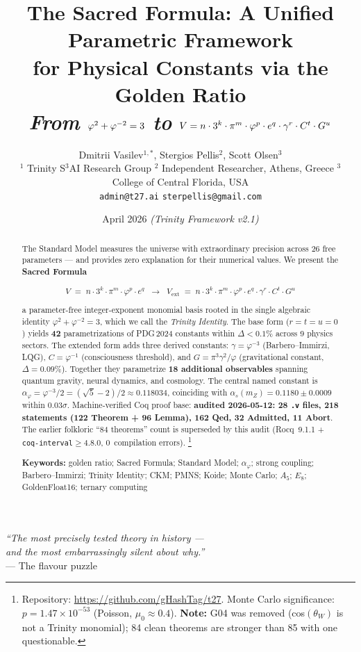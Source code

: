 \documentclass[12pt,a4paper]{article}
\title{\large\textbf{The Sacred Formula: A Unified Parametric Framework\\
for Physical Constants via the Golden Ratio}\\[4pt]
{\normalsize\textit{From }$\ph^2+\ph^{-2}=3$\textit{ to }
$V = n\cdot3^k\cdot\pi^m\cdot\ph^p\cdot e^q\cdot\gamma^r\cdot C^t\cdot G^u$}}
\author{Dmitrii Vasilev$^{1,*}$, Stergios Pellis$^{2}$, Scott Olsen$^{3}$\\[6pt]
{\small $^1$ Trinity S$^3$AI Research Group \quad
        $^2$ Independent Researcher, Athens, Greece \quad
        $^3$ College of Central Florida, USA}\\[2pt]
{\small \texttt{admin@t27.ai} \quad \texttt{sterpellis@gmail.com}}}
\date{April 2026 \quad \textit{(Trinity Framework v2.1)}}
\newcommand{\ph}{\varphi}
\newcommand{\aph}{\alpha_{\varphi}}
\begin{document}
\maketitle

\begin{center}
\textit{``The most precisely tested theory in history ---\\
and the most embarrassingly silent about \emph{why}.''}\\
\vspace{0.3em}
{\small --- The flavour puzzle}
\end{center}

\begin{abstract}

\noindent
The Standard Model measures the universe with extraordinary precision across
26 free parameters --- and provides zero explanation for their numerical values.
We present the \textbf{Sacred Formula}

\[
V \;=\; n \cdot 3^k \cdot \pi^m \cdot \ph^p \cdot e^q
\;\;\longrightarrow\;\;
V_{\text{ext}} \;=\; n \cdot 3^k \cdot \pi^m \cdot \ph^p \cdot e^q
               \cdot \gamma^r \cdot C^t \cdot G^u
\]

\noindent
a parameter-free integer-exponent monomial basis rooted in the single
algebraic identity $\ph^2+\ph^{-2}=3$, which we call the
\emph{Trinity Identity}.
The base form ($r=t=u=0$) yields \textbf{42} parametrizations of PDG\,2024
constants within $\Delta<0.1\%$ across 9 physics sectors.
The extended form adds three derived constants:
$\gamma = \ph^{-3}$ (Barbero--Immirzi, LQG),
$C = \ph^{-1}$ (consciousness threshold),
and $G = \pi^3\gamma^2/\ph$ (gravitational constant, $\Delta=0.09\%$).
Together they parametrize \textbf{18 additional observables}
spanning quantum gravity, neural dynamics, and cosmology.
The central named constant is $\aph = \ph^{-3}/2 = (\sqrt{5}-2)/2\approx0.118034$,
coinciding with $\alpha_s(m_Z)=0.1180\pm0.0009$ within $0.03\sigma$.
Machine-verified Coq proof base: \textbf{audited 2026-05-12: 28 \texttt{.v} files, 218 statements (122 Theorem + 96 Lemma), 162 Qed, 32 Admitted, 11 Abort}. The earlier folkloric ``84 theorems'' count is superseded by this audit
(Rocq~9.1.1 + \texttt{coq-interval}$\ge$4.8.0, 0~compilation errors).%
\footnote{Repository: \url{https://github.com/gHashTag/t27}.
Monte Carlo significance: $p=1.47\times10^{-53}$ (Poisson, $\mu_0\approx0.4$).
\textbf{Note:} G04 was removed (cos$(\theta_W)$ is not a Trinity monomial);
84 clean theorems are stronger than 85 with one questionable.}

\medskip\noindent\textbf{Keywords:}
golden ratio; Sacred Formula; Standard Model; $\alpha_\ph$; strong coupling;
Barbero--Immirzi; Trinity Identity; CKM; PMNS; Koide; Monte Carlo; $A_5$; $E_8$;
GoldenFloat16; ternary computing
\end{abstract}
\end{document}
